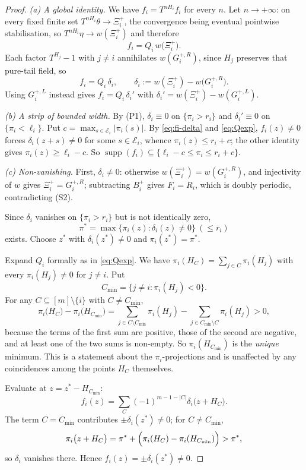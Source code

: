 \documentclass[11pt,reqno]{amsart}
\theoremstyle{plain}
\theoremstyle{definition}
\theoremstyle{remark}
\theoremstyle{plain}
\theoremstyle{remark}
\theoremstyle{definition}
\numberwithin{equation}{section}
\DeclareMathOperator{\supp}{supp}
\newcommand{\cE}{\mathcal{E}}
\begin{document}
\begin{proof}
\emph{(a) A global identity.}  We have $f_i=T^{nH_i}f_i$ for every $n$.  Let
$n\to+\infty$: on every fixed finite set $T^{nH_i}\theta\to\Xi_i^+$, the
convergence being eventual pointwise stabilisation, so
$T^{nH_i}\eta\to w(\Xi_i^+)$ and therefore
\begin{equation}
f_i=Q_i\,w\bigl(\Xi_i^+\bigr). \label{eq:fi-Xi}
\end{equation}
Each factor $T^{H_j}-1$ with $j\ne i$ annihilates $w(G_i^{+,R})$, since $H_j$
preserves that pure-tail field, so
\begin{equation}
f_i=Q_i\,\delta_i,\qquad
\delta_i:=w(\Xi_i^+)-w\bigl(G_i^{+,R}\bigr). \label{eq:fi-delta}
\end{equation}
Using $G_i^{+,L}$ instead gives $f_i=Q_i\,\delta_i'$ with
$\delta_i'=w(\Xi_i^+)-w(G_i^{+,L})$.

\emph{(b) A strip of bounded width.}  By \textup{(P1)}, $\delta_i\equiv0$ on
$\{\pi_i>r_i\}$ and $\delta_i'\equiv0$ on $\{\pi_i<\ell_i\}$.  Put
$c=\max_{s\in\cE_i}|\pi_i(s)|$.  By \eqref{eq:fi-delta} and \eqref{eq:Qexp},
$f_i(z)\ne0$ forces $\delta_i(z+s)\ne0$ for some $s\in\cE_i$, whence
$\pi_i(z)\le r_i+c$; the other identity gives $\pi_i(z)\ge\ell_i-c$.  So
$\supp(f_i)\subseteq\{\ell_i-c\le\pi_i\le r_i+c\}$.

\emph{(c) Non-vanishing.}  First, $\delta_i\ne0$: otherwise
$w(\Xi_i^+)=w(G_i^{+,R})$, and injectivity of $w$ gives $\Xi_i^+=G_i^{+,R}$;
subtracting $B_i^+$ gives $F_i=R_i$, which is doubly periodic, contradicting
\textup{(S2)}.

Since $\delta_i$ vanishes on $\{\pi_i>r_i\}$ but is not identically zero,
\[\pi^*=\max\{\pi_i(z):\delta_i(z)\ne0\}\ (\le r_i)\]
exists.  Choose $z^*$ with $\delta_i(z^*)\ne0$ and $\pi_i(z^*)=\pi^*$.

Expand $Q_i$ formally as in \eqref{eq:Qexp}.  We have
$\pi_i(H_C)=\sum_{j\in C}\pi_i(H_j)$ with every $\pi_i(H_j)\ne0$ for $j\ne i$.
Put
\[C_{\min}=\{j\ne i:\pi_i(H_j)<0\}.\]
For any $C\subseteq[m]\setminus\{i\}$ with $C\ne C_{\min}$,
\[\pi_i\bigl(H_C\bigr)-\pi_i\bigl(H_{C_{\min}}\bigr)
  =\sum_{j\in C\setminus C_{\min}}\pi_i(H_j)
   -\sum_{j\in C_{\min}\setminus C}\pi_i(H_j)>0,\]
because the terms of the first sum are positive, those of the second are
negative, and at least one of the two sums is non-empty.  So
$\pi_i(H_{C_{\min}})$ is the \emph{unique} minimum.  This is a statement about
the $\pi_i$-projections and is unaffected by any coincidences among the points
$H_C$ themselves.

Evaluate at $z=z^*-H_{C_{\min}}$:
\[f_i(z)=\sum_{C}(-1)^{m-1-|C|}\delta_i\bigl(z+H_C\bigr).\]
The term $C=C_{\min}$ contributes $\pm\delta_i(z^*)\ne0$; for $C\ne C_{\min}$,
\[\pi_i\bigl(z+H_C\bigr)=\pi^*+\Bigl(\pi_i(H_C)-\pi_i(H_{C_{\min}})\Bigr)>\pi^*,\]
so $\delta_i$ vanishes there.  Hence $f_i(z)=\pm\delta_i(z^*)\ne0$.
\end{proof}
\end{document}
